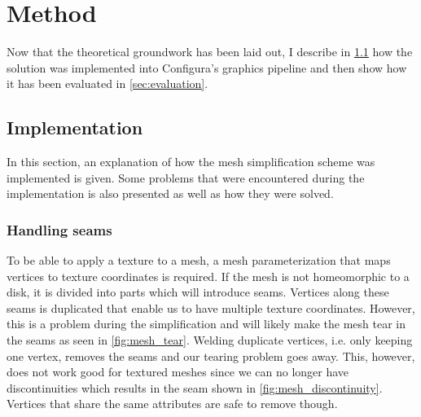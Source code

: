 

\chapter{Method} \label{cha:method}
  Now that the theoretical groundwork has been laid out, I describe in \cref{sec:implementation} how the solution was implemented into Configura's graphics pipeline and then show how it has been evaluated in \cref{sec:evaluation}.
  
\section{Implementation} \label{sec:implementation}
In this section, an explanation of how the mesh simplification scheme was implemented is given. Some problems that were encountered during the implementation is also presented as well as how they were solved.

\subsection{Handling seams}
To be able to apply a texture to a mesh, a mesh parameterization that maps vertices to texture coordinates is required. If the mesh is not homeomorphic to a disk, it is divided into parts which will introduce seams. Vertices along these seams is duplicated that enable us to have multiple texture coordinates. However, this is a problem during the simplification and will likely make the mesh tear in the seams as seen in \cref{fig:mesh_tear}. Welding duplicate vertices, i.e. only keeping one vertex, removes the seams and our tearing problem goes away. This, however, does not work good for textured meshes since we can no longer have discontinuities which results in the seam shown in \cref{fig:mesh_discontinuity}. Vertices that share the same attributes are safe to remove though.

